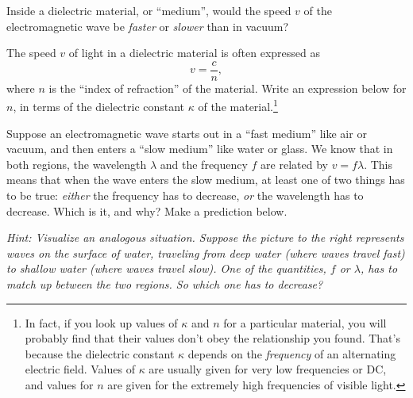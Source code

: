 \begin{enumerate}[labparts]

\item Inside a dielectric material, or ``medium'', would the speed $v$ of the electromagnetic wave be \textit{faster} or \textit{slower} than in vacuum?
\answerspace{0.4in}

\item The speed $v$ of light in a dielectric material is often expressed as 
$$v = \frac{c}{n},$$
where $n$ is the ``index of refraction'' of the material.  Write an expression below for $n$, in terms of the dielectric constant $\kappa$ of the material.\footnote{In fact, if you look up values of $\kappa$ and $n$ for a particular material, you will probably find that their values don't  obey the relationship you found.  That's because the dielectric constant $\kappa$ depends on the \textit{frequency} of an alternating electric field.  Values of $\kappa$ are usually given for very low frequencies or DC, and values for $n$ are given for the extremely high frequencies of visible light.}
\answerspace{0.6in}

\begin{minipage}{0.70\textwidth}
\item Suppose an electromagnetic wave starts out in a ``fast medium'' like air or vacuum, and then enters a ``slow medium'' like water or glass.  We know that in both regions, the wavelength $\lambda$ and the frequency $f$ are related by $v=f\lambda$.  This means that when the wave enters the slow medium, at least one of two things has to be true: \textit{either} the frequency has to decrease, \textit{or} the wavelength has to decrease.  Which is it, and why?  Make a prediction below.

\textit{Hint: Visualize an analogous situation. Suppose the picture to the right represents waves on the surface of water, traveling from deep water (where waves travel fast) to shallow water (where waves travel slow).  One of the quantities, $f$ or $\lambda$, has to match up between the two regions.  So which one has to decrease?}


\end{minipage}
\end{enumerate}
